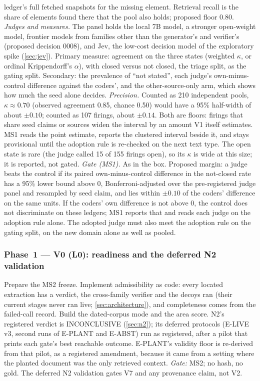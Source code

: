 ledger's full fetched snapshots for the missing element. Retrieval recall is the share of elements
found there that the pool also holds; proposed floor 0.80.
\emph{Judges and measures.} The panel holds the local 7B model, a stronger open-weight model,
frontier models from families other than the generator's and verifier's (proposed decision 0008), and
Jev, the low-cost decision model of the exploratory spike (\cref{sec:jev}). Primary measure: agreement
on the three states (weighted $\kappa$, or ordinal Krippendorff's $\alpha$), with closed versus not
closed, the triage split, as the gating split. Secondary: the prevalence of \enquote{not stated}, each
judge's own-minus-control difference against the coders', and the other-source-only arm, which shows
how much the seed alone decides.
\emph{Precision.} Counted as 210 independent pools, $\kappa \approx 0.70$ (observed agreement 0.85,
chance 0.50) would have a 95\% half-width of about $\pm 0.10$; counted as 107 firings, about
$\pm 0.14$. Both are floors: firings that share seed claims or sources widen the interval by an amount
V1 itself estimates. MS1 reads the point estimate, reports the clustered interval beside it, and stays
provisional until the adoption rule is re-checked on the next text type. The open state is rare (the
judge called 15 of 155 firings open), so its $\kappa$ is wide at this size; it is reported, not gated.
\emph{Gate (MS1).} As in the box. Proposed margin: a judge beats the control if its paired
own-minus-control difference in the not-closed rate has a 95\% lower bound above 0, Bonferroni-adjusted
over the pre-registered judge panel and resampled by seed claim, and lies within $\pm 0.10$ of the
coders' difference on the same units. If the coders' own difference is not above 0, the control does not
discriminate on these ledgers; MS1 reports that and reads each judge on the adoption rule alone. The
adopted judge must also meet the adoption rule on the gating split, on the new domain alone as well as
pooled.

\subsubsection{Phase~1 --- V0 (L0): readiness and the deferred N2 validation}

Prepare the MS2 freeze. Implement admissibility as code: every located extraction has a verdict,
the cross-family verifier and the decoys ran (their current stages never ran live;
\cref{sec:architecture}), and completeness comes from the failed-call record. Build the dated-corpus
mode and the area score. N2's registered verdict is INCONCLUSIVE (\cref{sec:n2}); its deferred
protocols (E-LIVE v3, second runs of E-PLANT and E-ABST) run as registered, after a pilot that
prints each gate's best reachable outcome. E-PLANT's validity floor is re-derived from that pilot,
as a registered amendment, because it came from a setting where the planted document was the only
retrieved context. \emph{Gate:} MS2; no hash, no gold. The deferred N2 validation gates V7 and any
provenance claim, not V2.

